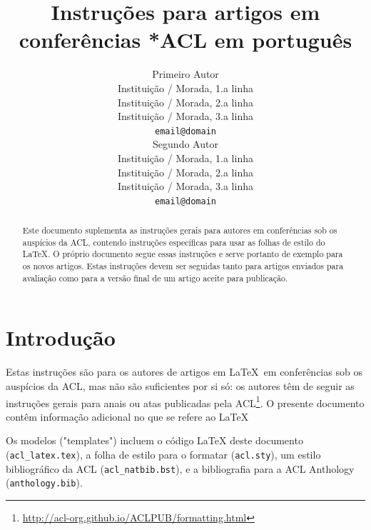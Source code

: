 \documentclass[11pt]{article}
\title{Instruções para artigos em conferências *ACL em português}
\author{Primeiro Autor \\
    Instituição / Morada, 1.a linha  \\
    Instituição / Morada, 2.a linha  \\
    Instituição / Morada, 3.a linha  \\
  \texttt{email@domain} \\\And
  Segundo Autor \\
    Instituição / Morada, 1.a linha  \\
    Instituição / Morada, 2.a linha  \\
    Instituição / Morada, 3.a linha  \\
  \texttt{email@domain} \\}
\begin{document}
\maketitle
\begin{abstract}
Este documento suplementa as instruções gerais para autores em conferências sob os auspícios da ACL, contendo instruções específicas para usar as folhas de estilo do \LaTeX{}.
O próprio documento segue essas instruções e serve portanto de exemplo para os novos artigos.
Estas instruções devem ser seguidas tanto para artigos enviados para avaliação como para a versão final de um artigo aceite para publicação.

\end{abstract}

\section{Introdução}

Estas instruções são para os autores de artigos em \LaTeX~em conferências sob os auspícios da ACL, mas não são suficientes por si só: os autores têm de seguir as instruções gerais para anais ou atas publicadas pela ACL\footnote{\url{http://acl-org.github.io/ACLPUB/formatting.html}}. O presente documento contêm informação adicional no que se refere ao \LaTeX{}

Os modelos ("templates") incluem o código \LaTeX{} deste documento (\texttt{acl\_latex.tex}), a folha de estilo para o formatar (\texttt{acl.sty}), um estilo bibliográfico da ACL (\texttt{acl\_natbib.bst}), e a bibliografia para a ACL Anthology (\texttt{anthology.bib}).
\end{document}
